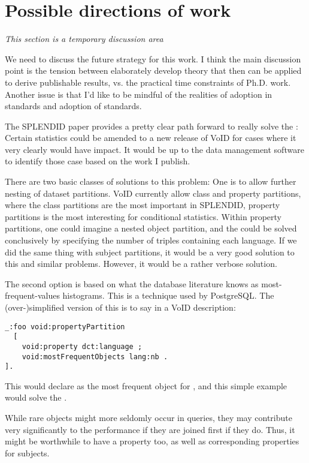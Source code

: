 \section{Possible directions of work}

\emph{This section is a temporary discussion area}

We need to discuss the future strategy for this work. I think the main
discussion point is the tension between elaborately develop theory
that then can be applied to derive publishable results, vs. the
practical time constraints of Ph.D. work. Another issue is that I'd
like to be mindful of the realities of adoption in standards and
adoption of standards.

The SPLENDID paper provides a pretty clear path forward to really
solve the \langcase: Certain statistics could be amended to a new
release of VoID for cases where it very clearly would have impact. It
would be up to the data management software to identify those case
based on the work I publish.

There are two basic classes of solutions to this problem: One is to
allow further nesting of dataset partitions. VoID currently allow
class and property partitions, where the class partitions are the most
important in SPLENDID, property partitions is the most interesting for
conditional statistics. Within property partitions, one could imagine
a nested object partition, and the \langcase{} could be solved
conclusively by specifying the number of triples containing each
language. If we did the same thing with subject partitions, it would
be a very good solution to this and similar problems. However, it
would be a rather verbose solution. 

The second option is based on what the database literature knows as
most-frequent-values histograms. This is a technique used by
PostgreSQL. The (over-)simplified version of this is to say in a VoID
description: 

\begin{verbatim}
_:foo void:propertyPartition 
  [
    void:property dct:language ;
    void:mostFrequentObjects lang:nb .
].
\end{verbatim}
This would declare  as the most frequent object for
, and this simple example would solve the
\langcase. 

While rare objects might more seldomly occur in queries, they may
contribute very significantly to the performance if they are joined
first if they do. Thus, it might be worthwhile to have a property
 too, as well as corresponding
properties for subjects.


